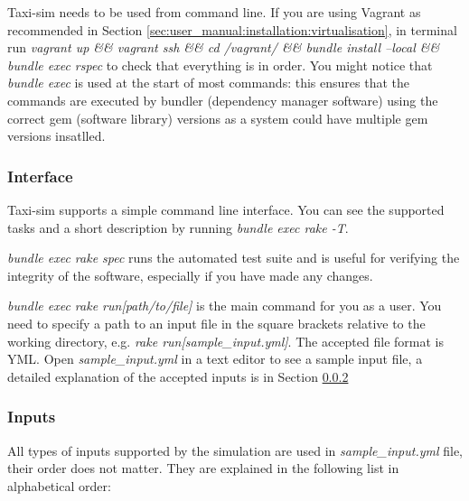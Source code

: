  Taxi-sim needs to be
used from command line. If you are using Vagrant as recommended in Section
\ref{sec:user_manual:installation:virtualisation}, in terminal run
\textit{vagrant up \&\& vagrant ssh \&\& cd /vagrant/ \&\& bundle install
--local \&\& bundle exec rspec} to check that everything is in order. You might
notice that \textit{bundle exec} is used at the start of most commands: this
ensures that the commands are executed by bundler (dependency manager software)
using the correct gem (software library) versions as a system could have
multiple gem versions insatlled.


\subsubsection{Interface}
\label{sec:user_manual:using:interface}

Taxi-sim supports a simple command line interface. You can see the supported
tasks and a short description by running \textit{bundle exec rake -T}.

\textit{bundle exec rake spec} runs the automated test suite and is useful for
verifying the integrity of the software, especially if you have made any
changes.

\textit{bundle exec rake run[path/to/file]} is the main command for you as a
user. You need to specify a path to an input file in the square brackets
relative to the working directory, e.g. \textit{rake run[sample\_input.yml]}.
The accepted file format is YML. Open \textit{sample\_input.yml} in a text
editor to see a sample input file, a detailed explanation of the accepted
inputs is in Section \ref{sec:user_manual:using:inputs}


\subsubsection{Inputs}
\label{sec:user_manual:using:inputs}


All types of inputs supported by the simulation are used in
\textit{sample\_input.yml} file, their order does not matter. They are explained
in the following list in alphabetical order:

